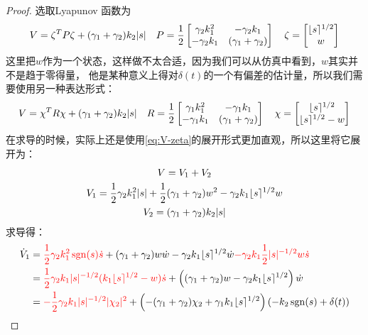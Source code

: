 \begin{proof}
	
	选取Lyapunov 函数为
	\begin{equation}
		\label{eq:V-zeta}
		V=\zeta^T P \zeta + (\gamma_1 +\gamma_2)k_2 |s|\quad 
		P=\frac12 \begin{bmatrix}
			\gamma_2 k_1^2  & -\gamma_2 k_1\\
			-\gamma_2 k_1 & (\gamma_1+\gamma_2)\\
		\end{bmatrix}
		\quad 
		\zeta =\begin{bmatrix}
			\lfloor s \rceil^{1/2}\\
			w
		\end{bmatrix}
	\end{equation}
	这里把$w$作为一个状态，这样做不太合适，因为我们可以从仿真中看到，$w$其实并不是趋于零得量，
	他是某种意义上得对$\delta(t)$的一个有偏差的估计量，所以我们需要使用另一种表达形式：
	\begin{equation}
		V=\chi^T R \chi + (\gamma_1 +\gamma_2)k_2 |s|\quad 
		R=\frac12 \begin{bmatrix}
			\gamma_1 k_1^2  & -\gamma_1 k_1\\
			-\gamma_1 k_1 & (\gamma_1+\gamma_2)\\
		\end{bmatrix}\quad 
		\chi=\begin{bmatrix}
			\lfloor s \rceil^{1/2}\\
			\lfloor s \rceil^{1/2}-w
		\end{bmatrix}
	\end{equation}
	在求导的时候，实际上还是使用\eqref{eq:V-zeta}的展开形式更加直观，所以这里将它展开为：
	\begin{gather*}
		V=V_1+V_2\\
		V_1=\frac12 \gamma_2 k_1^2 |s|
		+ \frac12(\gamma_1+\gamma_2) w^2
		-\gamma_2 k_1 \lfloor s \rceil^{1/2}w
		\\
		V_2=(\gamma_1+\gamma_2)k_2 |s|
	\end{gather*}
	求导得：
	\begin{align*}
		\dot{V}_1
		&=\tR{\frac12 \gamma_2 k_1^2 \sgn{s}\dot{s}}
		+(\gamma_1+\gamma_2) w \dot{w}
		-\gamma_2 k_1 \sig{s}^{1/2}\dot{w}
		\tR{-\gamma_2 k_1 \frac12 |s|^{-1/2}w\dot{s}}
		\\
		&=\tR{\frac12 \gamma_2 k_1 |s|^{-1/2} (k_1\sig{s}^{1/2}-w)\dot{s}}
		+\left((\gamma_1+\gamma_2) w -\gamma_2 k_1 \sig{s}^{1/2}\right)\dot{w}
		\\
		&=\tR{-\frac12 \gamma_2 k_1 |s|^{-1/2} |\chi_2|^2}
		+\left(-(\gamma_1+\gamma_2) \chi_2 +\gamma_1 k_1 \sig{s}^{1/2}\right)(-k_2\sgn{s}+\delta(t))

\end{align*}
\end{proof}
